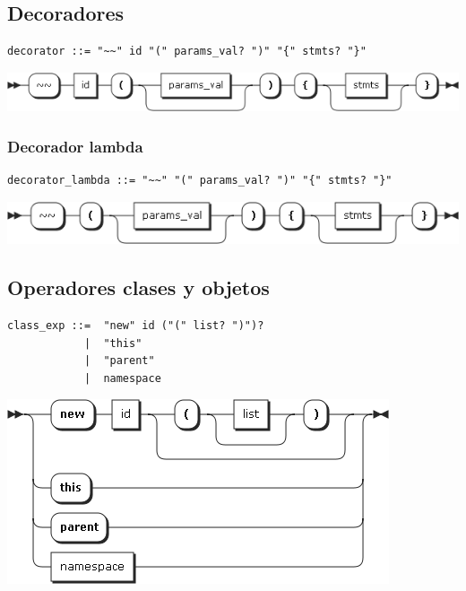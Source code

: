 \subsection{Decoradores}
\begin{lstlisting}[style=nonumbers]
decorator ::= "~~" id "(" params_val? ")" "{" stmts? "}"
\end{lstlisting}
\begin{center}
\includegraphics[scale=0.5]{diagram/decorator.png} \\
\end{center}
\subsubsection{Decorador lambda}
\begin{lstlisting}[style=nonumbers]
decorator_lambda ::= "~~" "(" params_val? ")" "{" stmts? "}"
\end{lstlisting}
\begin{center}
\includegraphics[scale=0.5]{diagram/function_decorator.png} \\
\end{center}




\pagebreak
\subsection{Operadores clases y objetos}
\begin{multicols}{2}
\begin{lstlisting}[style=nonumbers]      
class_exp ::=  "new" id ("(" list? ")")?
            |  "this" 
            |  "parent"
            |  namespace
\end{lstlisting}  
\columnbreak	
\begin{center}
\includegraphics[scale=0.5]{diagram/class_exp.png} \\
\end{center}
\end{multicols}

